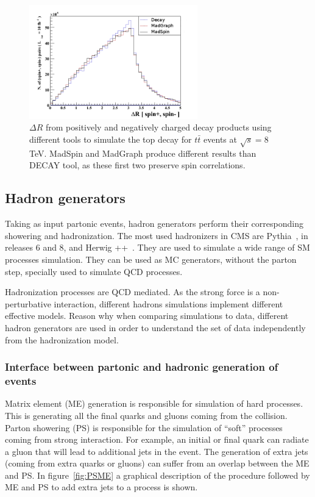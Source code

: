 \begin{figure}[!Hhtbp]
  \begin{center}
    \includegraphics[width=0.65\textwidth]{figs/TT_MadSPin_2.png}
    \caption{$\Delta R$ from positively and negatively charged decay products using different tools to simulate the top decay for $t\bar{t}$ events at $\sqrt{s}=8$ TeV. MadSpin and MadGraph produce different results than DECAY tool, as these first two preserve spin correlations.}
    \label{fig:MS2}
  \end{center}
\end{figure}

\subsection{Hadron generators}
\label{sec:Had}

Taking as input partonic events, hadron generators perform their corresponding showering and hadronization. The most used hadronizers in CMS are Pythia~\cite{Sjostrand:2006za}, in releases 6 and 8, and Herwig ++~\cite{Bahr:2008pv}. They are used to simulate a wide range of SM processes simulation. They can be used as MC generators, without the parton step, specially used to simulate QCD processes.

Hadronization processes are QCD mediated. As the strong force is a non-perturbative interaction, different hadrons simulations implement different effective models. Reason why when comparing simulations to data, different hadron generators are used in order to understand the set of data independently from the hadronization model. 

\subsubsection{Interface between partonic and hadronic generation of events}
\label{sec:Merging}

Matrix element (ME) generation is responsible for simulation of hard processes. This is generating all the final quarks and gluons coming from the collision. Parton showering (PS) is responsible for the simulation of ``soft'' processes coming from strong interaction. For example, an initial or final quark can radiate a gluon that will lead to additional jets in the event. The generation of extra jets (coming from extra quarks or gluons) can suffer from an overlap between the ME and PS. In figure~\ref{fig:PSME} a graphical description of the procedure followed by ME and PS to add extra jets to a process is shown. 

